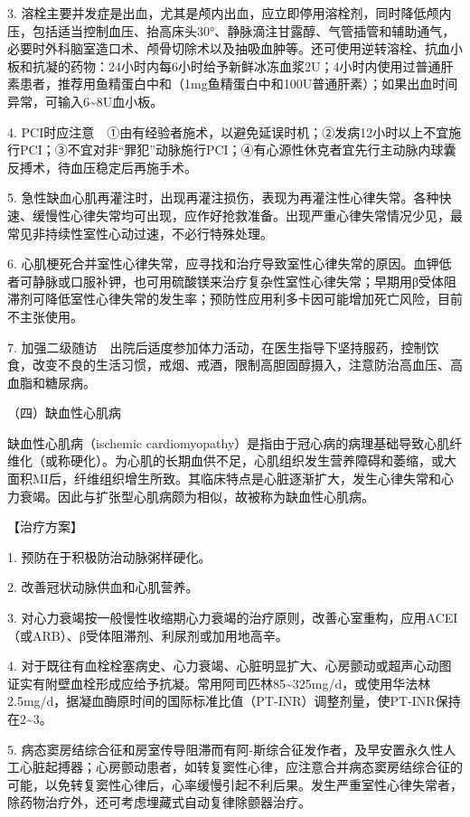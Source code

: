 3.
溶栓主要并发症是出血，尤其是颅内出血，应立即停用溶栓剂，同时降低颅内压，包括适当控制血压、抬高床头30°、静脉滴注甘露醇、气管插管和辅助通气，必要时外科脑室造口术、颅骨切除术以及抽吸血肿等。还可使用逆转溶栓、抗血小板和抗凝的药物：24小时内每6小时给予新鲜冰冻血浆2U；4小时内使用过普通肝素患者，推荐用鱼精蛋白中和（1mg鱼精蛋白中和100U普通肝素）；如果出血时间异常，可输入6\textasciitilde{}8U血小板。

4.
PCI时应注意　①由有经验者施术，以避免延误时机；②发病12小时以上不宜施行PCI；③不宜对非“罪犯”动脉施行PCI；④有心源性休克者宜先行主动脉内球囊反搏术，待血压稳定后再施手术。

5.
急性缺血心肌再灌注时，出现再灌注损伤，表现为再灌注性心律失常。各种快速、缓慢性心律失常均可出现，应作好抢救准备。出现严重心律失常情况少见，最常见非持续性室性心动过速，不必行特殊处理。

6.
心肌梗死合并室性心律失常，应寻找和治疗导致室性心律失常的原因。血钾低者可静脉或口服补钾，也可用硫酸镁来治疗复杂性室性心律失常；早期用β受体阻滞剂可降低室性心律失常的发生率；预防性应用利多卡因可能增加死亡风险，目前不主张使用。

7.
加强二级随访　出院后适度参加体力活动，在医生指导下坚持服药，控制饮食，改变不良的生活习惯，戒烟、戒酒，限制高胆固醇摄入，注意防治高血压、高血脂和糖尿病。

{（四）缺血性心肌病}

缺血性心肌病（ischemic
cardiomyopathy）是指由于冠心病的病理基础导致心肌纤维化（或称硬化）。为心肌的长期血供不足，心肌组织发生营养障碍和萎缩，或大面积MI后，纤维组织增生所致。其临床特点是心脏逐渐扩大，发生心律失常和心力衰竭。因此与扩张型心肌病颇为相似，故被称为缺血性心肌病。

【治疗方案】

1. 预防在于积极防治动脉粥样硬化。

2. 改善冠状动脉供血和心肌营养。

3.
对心力衰竭按一般慢性收缩期心力衰竭的治疗原则，改善心室重构，应用ACEI（或ARB）、β受体阻滞剂、利尿剂或加用地高辛。

4.
对于既往有血栓栓塞病史、心力衰竭、心脏明显扩大、心房颤动或超声心动图证实有附壁血栓形成应给予抗凝。常用阿司匹林85\textasciitilde{}325mg/d，或使用华法林2.5mg/d，据凝血酶原时间的国际标准比值（PT-INR）调整剂量，使PT-INR保持在2\textasciitilde{}3。

5.
病态窦房结综合征和房室传导阻滞而有阿-斯综合征发作者，及早安置永久性人工心脏起搏器；心房颤动患者，如转复窦性心律，应注意合并病态窦房结综合征的可能，以免转复窦性心律后，心率缓慢引起不利后果。发生严重室性心律失常者，除药物治疗外，还可考虑埋藏式自动复律除颤器治疗。

